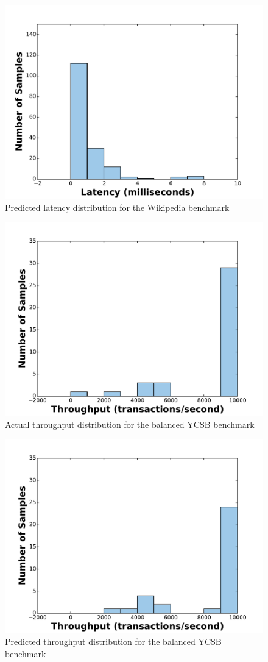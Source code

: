 \begin{figure}[h!]
    \centering
    \includegraphics[width=0.7\linewidth]{figure/wikipedia_pred_hist_latency_mutate.pdf}
    \caption{Predicted latency distribution for the Wikipedia benchmark}
    \label{fig:predicted_latency_wikipedia}
\end{figure}

\begin{figure}[h!]
    \centering
    \includegraphics[width=0.7\linewidth]{figure/ycsb_balanced_test_hist_throughput_mutate.pdf}
    \caption{Actual throughput distribution for the balanced YCSB benchmark}
    \label{fig:actual_latency_ycsb_balanced}
\end{figure}

\begin{figure}[h!]
    \centering
    \includegraphics[width=0.7\linewidth]{figure/ycsb_balanced_pred_hist_throughput_mutate.pdf}
    \caption{Predicted throughput distribution for the balanced YCSB benchmark}
    \label{fig:predicted_latency_ycsb_balanced}
\end{figure}

